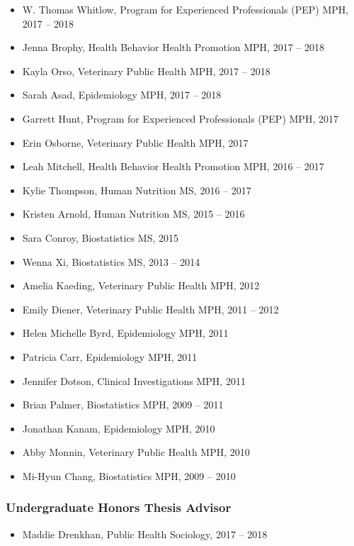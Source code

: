 \documentclass[
  english,
  letterpaper,
  DIV=11,
  numbers=noendperiod]{scrartcl}
\providecommand{\tightlist}{%
  \setlength{\itemsep}{0pt}\setlength{\parskip}{0pt}}
\begin{document}
\begin{itemize}
\item
  W. Thomas Whitlow, Program for Experienced Professionals (PEP) MPH,
  2017 -- 2018
\item
  Jenna Brophy, Health Behavior Health Promotion MPH, 2017 -- 2018
\item
  Kayla Orso, Veterinary Public Health MPH, 2017 -- 2018
\item
  Sarah Asad, Epidemiology MPH, 2017 -- 2018
\item
  Garrett Hunt, Program for Experienced Professionals (PEP) MPH, 2017
\item
  Erin Osborne, Veterinary Public Health MPH, 2017
\item
  Leah Mitchell, Health Behavior Health Promotion MPH, 2016 -- 2017
\item
  Kylie Thompson, Human Nutrition MS, 2016 -- 2017
\item
  Kristen Arnold, Human Nutrition MS, 2015 -- 2016
\item
  Sara Conroy, Biostatistics MS, 2015
\item
  Wenna Xi, Biostatistics MS, 2013 -- 2014
\item
  Amelia Kaeding, Veterinary Public Health MPH, 2012
\item
  Emily Diener, Veterinary Public Health MPH, 2011 -- 2012
\item
  Helen Michelle Byrd, Epidemiology MPH, 2011
\item
  Patricia Carr, Epidemiology MPH, 2011
\item
  Jennifer Dotson, Clinical Investigations MPH, 2011
\item
  Brian Palmer, Biostatistics MPH, 2009 -- 2011
\item
  Jonathan Kanam, Epidemiology MPH, 2010
\item
  Abby Monnin, Veterinary Public Health MPH, 2010
\item
  Mi-Hyun Chang, Biostatistics MPH, 2009 -- 2010
\end{itemize}

\subsubsection{Undergraduate Honors Thesis
Advisor}\label{undergraduate-honors-thesis-advisor}

\begin{itemize}
\tightlist
\item
  Maddie Drenkhan, Public Health Sociology, 2017 -- 2018
\end{itemize}
\end{document}
